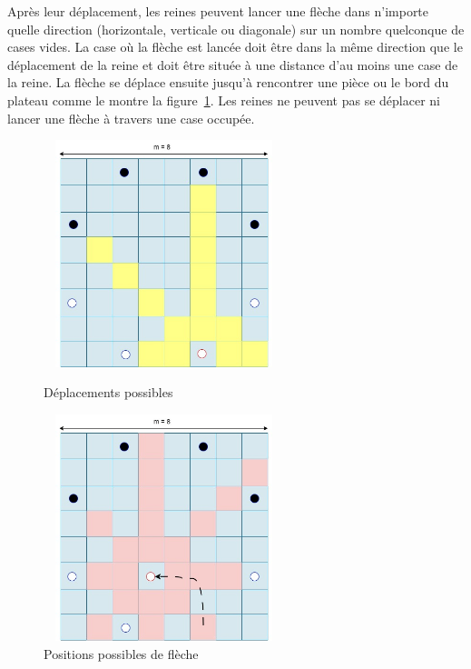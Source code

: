 \documentclass[11pt]{article}
\begin{document}
        Après leur déplacement, les reines peuvent lancer une flèche dans n'importe quelle direction (horizontale, verticale ou diagonale) sur un nombre quelconque de cases vides. La case où la flèche est lancée doit être dans la même direction que le déplacement de la reine et doit être située à une distance d'au moins une case de la reine. La flèche se déplace ensuite jusqu'à rencontrer une pièce ou le bord du plateau comme le montre la figure~\ref{fig:fleches possibilites}. Les reines ne peuvent pas se déplacer ni lancer une flèche à travers une case occupée.
                    \begin{figure}[h]
                \begin{minipage}[c]{.45\linewidth}
                    \centering
                    \includegraphics[width = 7cm, height = 6.6cm]{deplacement_qeen.jpeg}
                    \caption{Déplacements possibles}
                    \label{fig:deplacments possibles}
        \end{minipage}
            \hfill%
                \begin{minipage}[c]{.45\linewidth}
                      \centering
                    \includegraphics[width = 7cm, height = 6.6cm]{fleche_possibilites.jpeg}
                    \caption{Positions possibles de flèche}
                    \label{fig:fleches possibilites} 
                \end{minipage} 
            \end{figure}
\end{document}
